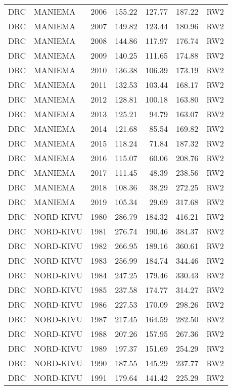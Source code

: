 \begin{longtable}{lllrrrl}
  DRC & MANIEMA & 2006 & 155.22 & 127.77 & 187.22 & RW2 \\ 
  DRC & MANIEMA & 2007 & 149.82 & 123.44 & 180.96 & RW2 \\ 
  DRC & MANIEMA & 2008 & 144.86 & 117.97 & 176.74 & RW2 \\ 
  DRC & MANIEMA & 2009 & 140.25 & 111.65 & 174.88 & RW2 \\ 
  DRC & MANIEMA & 2010 & 136.38 & 106.39 & 173.19 & RW2 \\ 
  DRC & MANIEMA & 2011 & 132.53 & 103.44 & 168.17 & RW2 \\ 
  DRC & MANIEMA & 2012 & 128.81 & 100.18 & 163.80 & RW2 \\ 
  DRC & MANIEMA & 2013 & 125.21 & 94.79 & 163.07 & RW2 \\ 
  DRC & MANIEMA & 2014 & 121.68 & 85.54 & 169.82 & RW2 \\ 
  DRC & MANIEMA & 2015 & 118.24 & 71.84 & 187.32 & RW2 \\ 
  DRC & MANIEMA & 2016 & 115.07 & 60.06 & 208.76 & RW2 \\ 
  DRC & MANIEMA & 2017 & 111.45 & 48.39 & 238.56 & RW2 \\ 
  DRC & MANIEMA & 2018 & 108.36 & 38.29 & 272.25 & RW2 \\ 
  DRC & MANIEMA & 2019 & 105.34 & 29.69 & 317.68 & RW2 \\ 
  DRC & NORD-KIVU & 1980 & 286.79 & 184.32 & 416.21 & RW2 \\ 
  DRC & NORD-KIVU & 1981 & 276.74 & 190.46 & 384.37 & RW2 \\ 
  DRC & NORD-KIVU & 1982 & 266.95 & 189.16 & 360.61 & RW2 \\ 
  DRC & NORD-KIVU & 1983 & 256.99 & 184.74 & 344.46 & RW2 \\ 
  DRC & NORD-KIVU & 1984 & 247.25 & 179.46 & 330.43 & RW2 \\ 
  DRC & NORD-KIVU & 1985 & 237.58 & 174.77 & 314.27 & RW2 \\ 
  DRC & NORD-KIVU & 1986 & 227.53 & 170.09 & 298.26 & RW2 \\ 
  DRC & NORD-KIVU & 1987 & 217.45 & 164.59 & 282.50 & RW2 \\ 
  DRC & NORD-KIVU & 1988 & 207.26 & 157.95 & 267.36 & RW2 \\ 
  DRC & NORD-KIVU & 1989 & 197.37 & 151.69 & 254.29 & RW2 \\ 
  DRC & NORD-KIVU & 1990 & 187.55 & 145.29 & 237.77 & RW2 \\ 
  DRC & NORD-KIVU & 1991 & 179.64 & 141.42 & 225.29 & RW2 \\ 

\end{longtable}
